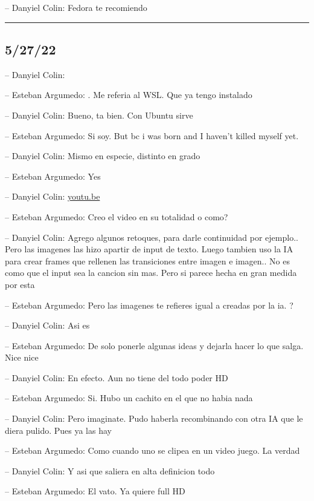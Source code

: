 -- Danyiel Colin: Fedora te recomiendo

\begin{center}\rule{0.5\linewidth}{0.5pt}\end{center}

\hypertarget{section-87}{%
\subsection{5/27/22}\label{section-87}}

-- Danyiel Colin:

-- Esteban Argumedo: . Me referia al WSL. Que ya tengo instalado

-- Danyiel Colin: Bueno, ta bien. Con Ubuntu sirve

-- Esteban Argumedo: Si soy. But bc i was born and I haven't killed
myself yet.

-- Danyiel Colin: Mismo en especie, distinto en grado

-- Esteban Argumedo: Yes

-- Danyiel Colin: \href{https://youtu.be/0fDJXmqdN-A}{youtu.be}

-- Esteban Argumedo: Creo el video en su totalidad o como?

-- Danyiel Colin: Agrego algunos retoques, para darle continuidad por
ejemplo.. Pero las imagenes las hizo apartir de input de texto. Luego
tambien uso la IA para crear frames que rellenen las transiciones entre
imagen e imagen.. No es como que el input sea la cancion sin mas. Pero
si parece hecha en gran medida por esta

-- Esteban Argumedo: Pero las imagenes te refieres igual a creadas por
la ia. ?

-- Danyiel Colin: Asi es

-- Esteban Argumedo: De solo ponerle algunas ideas y dejarla hacer lo
que salga. Nice nice

-- Danyiel Colin: En efecto. Aun no tiene del todo poder HD

-- Esteban Argumedo: Si. Hubo un cachito en el que no habia nada

-- Danyiel Colin: Pero imaginate. Pudo haberla recombinando con otra IA
que le diera pulido. Pues ya las hay

-- Esteban Argumedo: Como cuando uno se clipea en un video juego. La
verdad

-- Danyiel Colin: Y asi que saliera en alta definicion todo

-- Esteban Argumedo: El vato. Ya quiere full HD

